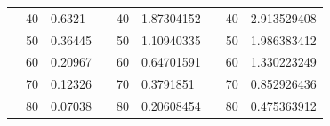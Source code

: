 \begin{table}[]
\begin{tabular}{|cclcclccl|}
\rowcolor[HTML]{DDFDFF} 
\multicolumn{1}{|c|}{\cellcolor[HTML]{FFFFC7}}                                & \multicolumn{1}{c|}{\cellcolor[HTML]{DDFDFF}40}        & \multicolumn{1}{l|}{\cellcolor[HTML]{DDFDFF}0.6321}     & \multicolumn{1}{c|}{\cellcolor[HTML]{FFFFC7}}                                & \multicolumn{1}{c|}{\cellcolor[HTML]{DDFDFF}40}        & \multicolumn{1}{l|}{\cellcolor[HTML]{DDFDFF}1.87304152} & \multicolumn{1}{c|}{\cellcolor[HTML]{FFFFC7}}                                & \multicolumn{1}{c|}{\cellcolor[HTML]{DDFDFF}40}        & 2.913529408 \\ \cline{2-3} \cline{5-6} \cline{8-9} 
\rowcolor[HTML]{DAE8FC} 
\multicolumn{1}{|c|}{\cellcolor[HTML]{FFFFC7}}                                & \multicolumn{1}{c|}{\cellcolor[HTML]{DAE8FC}50}        & \multicolumn{1}{l|}{\cellcolor[HTML]{DAE8FC}0.36445}    & \multicolumn{1}{c|}{\cellcolor[HTML]{FFFFC7}}                                & \multicolumn{1}{c|}{\cellcolor[HTML]{DAE8FC}50}        & \multicolumn{1}{l|}{\cellcolor[HTML]{DAE8FC}1.10940335} & \multicolumn{1}{c|}{\cellcolor[HTML]{FFFFC7}}                                & \multicolumn{1}{c|}{\cellcolor[HTML]{DAE8FC}50}        & 1.986383412 \\ \cline{2-3} \cline{5-6} \cline{8-9} 
\rowcolor[HTML]{DDFDFF} 
\multicolumn{1}{|c|}{\cellcolor[HTML]{FFFFC7}}                                & \multicolumn{1}{c|}{\cellcolor[HTML]{DDFDFF}60}        & \multicolumn{1}{l|}{\cellcolor[HTML]{DDFDFF}0.20967}    & \multicolumn{1}{c|}{\cellcolor[HTML]{FFFFC7}}                                & \multicolumn{1}{c|}{\cellcolor[HTML]{DDFDFF}60}        & \multicolumn{1}{l|}{\cellcolor[HTML]{DDFDFF}0.64701591} & \multicolumn{1}{c|}{\cellcolor[HTML]{FFFFC7}}                                & \multicolumn{1}{c|}{\cellcolor[HTML]{DDFDFF}60}        & 1.330223249 \\ \cline{2-3} \cline{5-6} \cline{8-9} 
\rowcolor[HTML]{DAE8FC} 
\multicolumn{1}{|c|}{\cellcolor[HTML]{FFFFC7}}                                & \multicolumn{1}{c|}{\cellcolor[HTML]{DAE8FC}70}        & \multicolumn{1}{l|}{\cellcolor[HTML]{DAE8FC}0.12326}    & \multicolumn{1}{c|}{\cellcolor[HTML]{FFFFC7}}                                & \multicolumn{1}{c|}{\cellcolor[HTML]{DAE8FC}70}        & \multicolumn{1}{l|}{\cellcolor[HTML]{DAE8FC}0.3791851}  & \multicolumn{1}{c|}{\cellcolor[HTML]{FFFFC7}}                                & \multicolumn{1}{c|}{\cellcolor[HTML]{DAE8FC}70}        & 0.852926436 \\ \cline{2-3} \cline{5-6} \cline{8-9} 
\rowcolor[HTML]{DDFDFF} 
\multicolumn{1}{|c|}{\cellcolor[HTML]{FFFFC7}}                                & \multicolumn{1}{c|}{\cellcolor[HTML]{DDFDFF}80}        & \multicolumn{1}{l|}{\cellcolor[HTML]{DDFDFF}0.07038}    & \multicolumn{1}{c|}{\cellcolor[HTML]{FFFFC7}}                                & \multicolumn{1}{c|}{\cellcolor[HTML]{DDFDFF}80}        & \multicolumn{1}{l|}{\cellcolor[HTML]{DDFDFF}0.20608454} & \multicolumn{1}{c|}{\cellcolor[HTML]{FFFFC7}}                                & \multicolumn{1}{c|}{\cellcolor[HTML]{DDFDFF}80}        & 0.475363912 \\ \cline{2-3} \cline{5-6} \cline{8-9} 

\end{tabular}
\end{table}
